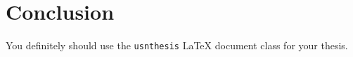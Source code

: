 \chapter{Conclusion}

You definitely should use the \texttt{usnthesis} \LaTeX{} document class for your thesis.
